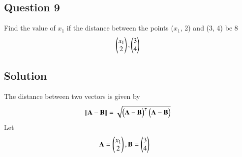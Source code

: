 \documentclass[journal,12pt,twocolumn]{IEEEtran}
\renewcommand\thesection{\arabic{section}}
\renewcommand\thesubsection{\thesection.\arabic{subsection}}
\renewcommand\thesubsubsection{\thesubsection.\arabic{subsubsection}}
\begin{document}
\subsection{Question 9}
\item
Find the value of $x_1$ if the distance between the points ($x_1$, 2)
and (3, 4) be 8
\begin{align}
\begin{pmatrix}x_1\\2\end{pmatrix}, \begin{pmatrix}3\\4\end{pmatrix} \label{eq:1}
\end{align}
\subsection{Solution}
\item
The distance between two vectors is given by 
\begin{align}
\lVert\mathbf{A}-\mathbf{B}\rVert=\sqrt{\begin{pmatrix}\mathbf{A}-\mathbf{B}\end{pmatrix}^\intercal \begin{pmatrix}\mathbf{A}-\mathbf{B}\end{pmatrix}} \label{eq:1.1}
\end{align}
Let
\begin{align}
\mathbf{A}&=\begin{pmatrix}x_1\\2\end{pmatrix}, \mathbf{B}=\begin{pmatrix}3\\4\end{pmatrix} \nonumber    
\end{align}
\end{document}
